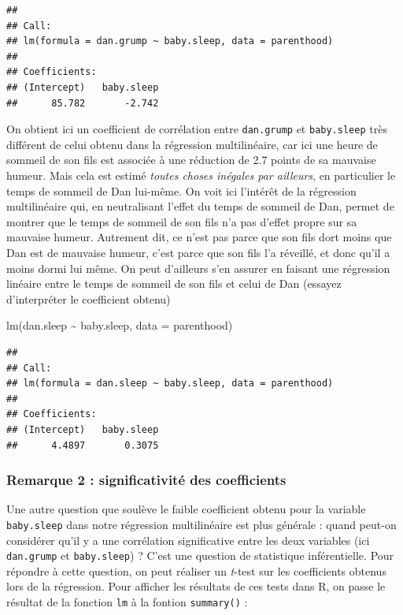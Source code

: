 \documentclass[
  french,
]{book}
\newenvironment{Shaded}{\begin{snugshade}}{\end{snugshade}}
\newcommand{\AttributeTok}[1]{\textcolor[rgb]{0.77,0.63,0.00}{#1}}
\newcommand{\FunctionTok}[1]{\textcolor[rgb]{0.00,0.00,0.00}{#1}}
\newcommand{\NormalTok}[1]{#1}
\newcommand{\SpecialCharTok}[1]{\textcolor[rgb]{0.00,0.00,0.00}{#1}}
\begin{document}
\begin{verbatim}
## 
## Call:
## lm(formula = dan.grump ~ baby.sleep, data = parenthood)
## 
## Coefficients:
## (Intercept)   baby.sleep  
##      85.782       -2.742
\end{verbatim}

On obtient ici un coefficient de corrélation entre \texttt{dan.grump} et \texttt{baby.sleep} très différent de celui obtenu dans la régression multilinéaire, car ici une heure de sommeil de son fils est associée à une réduction de 2.7 points de sa mauvaise humeur. Mais cela est estimé \emph{toutes choses inégales par ailleurs}, en particulier le temps de sommeil de Dan lui-même. On voit ici l'intérêt de la régression multilinéaire qui, en neutralisant l'effet du temps de sommeil de Dan, permet de montrer que le temps de sommeil de son fils n'a pas d'effet propre sur sa mauvaise humeur. Autrement dit, ce n'est pas parce que son fils dort moins que Dan est de mauvaise humeur, c'est parce que son fils l'a réveillé, et donc qu'il a moins dormi lui même. On peut d'ailleurs s'en assurer en faisant une régression linéaire entre le temps de sommeil de son fils et celui de Dan (essayez d'interpréter le coefficient obtenu)

\begin{Shaded}
\begin{Highlighting}[]
\FunctionTok{lm}\NormalTok{(dan.sleep }\SpecialCharTok{\textasciitilde{}}\NormalTok{ baby.sleep, }\AttributeTok{data =}\NormalTok{ parenthood)}
\end{Highlighting}
\end{Shaded}

\begin{verbatim}
## 
## Call:
## lm(formula = dan.sleep ~ baby.sleep, data = parenthood)
## 
## Coefficients:
## (Intercept)   baby.sleep  
##      4.4897       0.3075
\end{verbatim}

\hypertarget{remarque-2-significativituxe9-des-coefficients}{%
\subsubsection{Remarque 2 : significativité des coefficients}\label{remarque-2-significativituxe9-des-coefficients}}

Une autre question que soulève le faible coefficient obtenu pour la variable \texttt{baby.sleep} dans notre régression multilinéaire est plus générale : quand peut-on considérer qu'il y a une corrélation significative entre les deux variables (ici \texttt{dan.grump} et \texttt{baby.sleep}) ? C'est une question de statistique inférentielle. Pour répondre à cette question, on peut réaliser un \emph{t}-test sur les coefficients obtenus lors de la régression. Pour afficher les résultats de ces tests dans R, on passe le résultat de la fonction \texttt{lm} à la fontion \texttt{summary()} :
\end{document}
